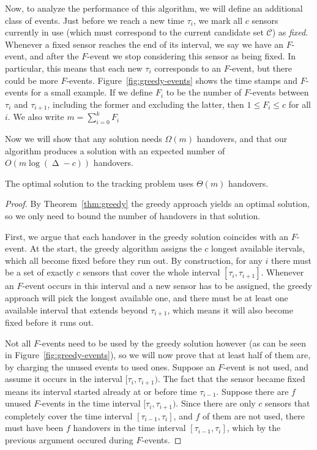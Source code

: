 \documentclass[runningheads]{llncs}
\newcommand {\script} [1] {\ensuremath {\mathcal {#1}}}
\DeclareMathOperator {\ply}{\Delta}
\begin{document}
    Now, to analyze the performance of this algorithm, we will define an additional class of events. Just before we reach a new time $\tau_i$, we mark all $c$ sensors currently in use (which must correspond to the current candidate set $\script C$) as \emph {fixed}. Whenever a fixed sensor reaches the end of its interval, we say we have an $F$-event, and after the $F$-event we stop considering this sensor as being fixed. In particular, this means that each new $\tau_i$ corresponds to an $F$-event, but there could be more $F$-events. Figure~\ref {fig:greedy-events} shows the time stamps and $F$-events for a small example. If we define $F_i$ to be the number of $F$-events between $\tau_i$ and $\tau_{i+1}$, including the former and excluding the latter, then $1 \leq F_i \leq c$ for all $i$. We also write $m = \sum_{i=0}^k F_i$

    Now we will show that any solution needs $\Omega(m)$ handovers, and that our algorithm produces a solution with  an expected number of $O (m \log (\ply - c))$ handovers.

    \begin {lemma}
      The optimal solution to the tracking problem uses $\Theta(m)$ handovers.
    \end {lemma}

    \begin {proof}
      By Theorem~\ref {thm:greedy} the greedy approach yields an optimal solution, so we only need to bound the number of handovers in that solution. 

      First, we argue that each handover in the greedy solution coincides with an $F$-event. At the start, the greedy algorithm assigns the $c$ longest available itervals, which all become fixed before they run out.
      By construction, for any $i$ there must be a set of exactly $c$ sensors that cover the whole interval $[\tau_i, \tau_{i+1}]$. Whenever an $F$-event occurs in this interval and a new sensor has to be assigned, the greedy approach will pick the longest available one, and there must be at least one available interval that extends beyond $\tau_{i+1}$, which means it will also become fixed before it runs out.

      Not all $F$-events need to be used by the greedy solution however (as can be seen in Figure~\ref {fig:greedy-events}), so we will now prove that at least half of them are, by charging the unused events to used ones. Suppose an $F$-event is not used, and assume it occurs in the interval $[\tau_i, \tau_{i+1})$. The fact that the sensor became fixed means its interval started already at or before time $\tau_{i-1}$. Suppose there are $f$ unused $F$-events in the time interval $[\tau_i, \tau_{i+1})$. Since there are only $c$ sensors that completely cover the time interval $[\tau_{i-1}, \tau_{i}]$, and $f$ of them are not used, there must have been $f$ handovers in the time interval $[\tau_{i-1}, \tau_{i}]$, which by the previous argument occured during $F$-events.        
    \end {proof}
\end{document}
